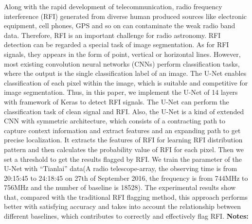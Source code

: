 \documentclass{report}
\begin{document}
{{{{{{{{{{{{{{{{{{{{{{{{{{{{{{{{{{{{{{{Along with the rapid development of telecommunication, radio frequency interference (RFI) generated from diverse human produced sources like electronic equipment, cell phones, GPS and so on can contaminate the weak radio band data. Therefore, RFI is an important challenge for radio astronomy. RFI detection can be regarded a special task of image segmentation. As for RFI signals, they appears in the form of point, vertical or horizontal lines. However, most existing convolution neural networks (CNNs) perform classification tasks, where the output is the single classification label of an image. The U-Net enables classification of each pixel within the image, which is suitable and competitive for image segmentation. Thus, in this paper, we implement the U-Net of 14 layers with framework of Keras to detect RFI signals. The U-Net can perform the classification task of clean signal and RFI. Also, the U-Net is a kind of extended CNN with symmetric architecture, which consists of a contracting path to capture context information and extract features and an expanding path to get precise localization. It extracts the features of RFI for learning RFI distribution pattern and then calculates the probability value of RFI for each pixel. Then we set a threshold to get the results flagged by RFI. We train the parameter of the U-Net with “Tianlai” data(A radio telescope-array, the observing time is from 20:15:45 to 24:18:45 on 27th of September 2016, the frequency is from 744MHz to 756MHz and the number of baseline is 18528). The experimental results show that, compared with the traditional RFI flagging method, this approach performs better with satisfying accuracy and takes into account the relationship between different baselines, which contributes to correctly and effectively flag RFI.\newline
{\bf Notes:}\newline
{\newpage
}}}}}}}}}}}}}}}}}}}}}}}}}}}}}}}}}}}}}}}}
\end{document}
